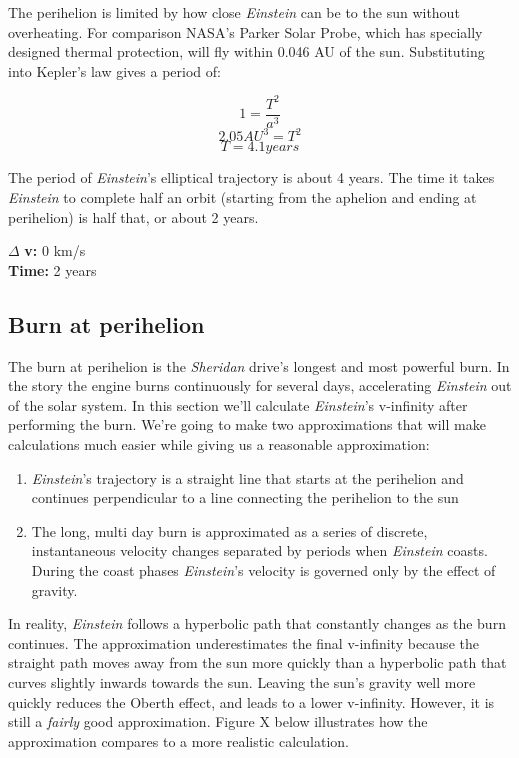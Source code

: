 \documentclass[12pt]{article} %
\begin{document}
The perihelion is limited by how close \textit{Einstein} can be to the sun without overheating. For comparison NASA's Parker Solar Probe, which has specially designed thermal protection, will fly within 0.046 AU of the sun. Substituting into Kepler's law gives a period of:

$$1 = \frac{T^2}{a^3}$$
$$2.05AU^{3} = T^2$$
$$T = 4.1 years$$

The period of \textit{Einstein}'s elliptical trajectory is about 4 years. The time it takes \textit{Einstein} to complete half an orbit (starting from the aphelion and ending at perihelion) is half that, or about 2 years.

$\Delta$ \textbf{v:} 0 km/s\\
\textbf{Time:} 2 years

\subsection{Burn at perihelion}
The burn at perihelion is the \textit{Sheridan} drive's longest and most powerful burn. In the story the engine burns continuously for several days, accelerating \textit{Einstein} out of the solar system. In this section we'll calculate \textit{Einstein}'s v-infinity after performing the burn. We're going to make two approximations that will make calculations much easier while giving us a reasonable approximation:

\begin{enumerate}
\item \textit{Einstein}'s trajectory is a straight line that starts at the perihelion and continues perpendicular to a line connecting the perihelion to the sun
\item The long, multi day burn is approximated as a series of discrete, instantaneous velocity changes separated by periods when \textit{Einstein} coasts. During the coast phases \textit{Einstein}'s velocity is governed only by the effect of gravity.
\end{enumerate}

In reality, \textit{Einstein} follows a hyperbolic path that constantly changes as the burn continues. The approximation underestimates the final v-infinity because the straight path moves away from the sun more quickly than a hyperbolic path that curves slightly inwards towards the sun. Leaving the sun's gravity well more quickly reduces the Oberth effect, and leads to a lower v-infinity. However, it is still a \textit{fairly} good approximation. Figure X below illustrates how the approximation compares to a more realistic calculation.
\end{document}
